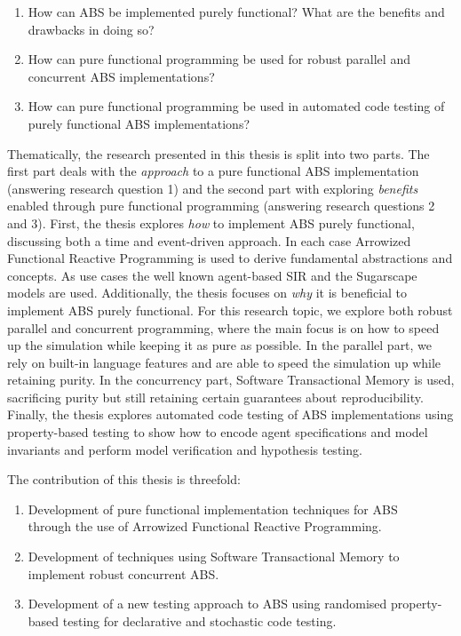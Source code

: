 \begin{enumerate}
	\item How can ABS be implemented purely functional? What are the benefits and drawbacks in doing so?
	\item How can pure functional programming be used for robust parallel and concurrent ABS implementations? 
	\item How can pure functional programming be used in automated code testing of purely functional ABS implementations?
\end{enumerate}

Thematically, the research presented in this thesis is split into two parts. The first part deals with the \textit{approach} to a pure functional ABS implementation (answering research question 1) and the second part with exploring \textit{benefits} enabled through pure functional programming (answering research questions 2 and 3).
First, the thesis explores \textit{how} to implement ABS purely functional, discussing both a time and event-driven approach. In each case Arrowized Functional Reactive Programming is used to derive fundamental abstractions and concepts. As use cases the well known agent-based SIR and the Sugarscape models are used. Additionally, the thesis focuses on \textit{why} it is beneficial to implement ABS purely functional. For this research topic, we explore both robust parallel and concurrent programming, where the main focus is on how to speed up the simulation while keeping it as pure as possible. In the parallel part, we rely on built-in language features and are able to speed the simulation up while retaining purity. In the concurrency part, Software Transactional Memory is used, sacrificing purity but still retaining certain guarantees about reproducibility. Finally, the thesis explores automated code testing of ABS implementations using property-based testing to show how to encode agent specifications and model invariants and perform model verification and hypothesis testing.

The contribution of this thesis is threefold:
\begin{enumerate}
	\item Development of pure functional implementation techniques for ABS \\ through the use of Arrowized Functional Reactive Programming.
	\item Development of techniques using Software Transactional Memory to implement robust concurrent ABS.
	\item Development of a new testing approach to ABS using randomised property-based testing for declarative and stochastic code testing.
\end{enumerate}

